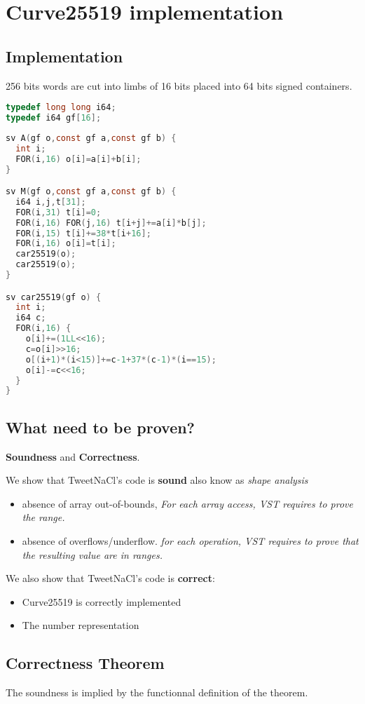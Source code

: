 \section{Curve25519 implementation}

\subsection{Implementation}

256 bits words are cut into limbs of 16 bits placed into 64 bits signed
containers.
\begin{lstlisting}[language=C]
typedef long long i64;
typedef i64 gf[16];
\end{lstlisting}

\begin{lstlisting}[language=C]
sv A(gf o,const gf a,const gf b) {
  int i;
  FOR(i,16) o[i]=a[i]+b[i];
}

sv M(gf o,const gf a,const gf b) {
  i64 i,j,t[31];
  FOR(i,31) t[i]=0;
  FOR(i,16) FOR(j,16) t[i+j]+=a[i]*b[j];
  FOR(i,15) t[i]+=38*t[i+16];
  FOR(i,16) o[i]=t[i];
  car25519(o);
  car25519(o);
}

sv car25519(gf o) {
  int i;
  i64 c;
  FOR(i,16) {
    o[i]+=(1LL<<16);
    c=o[i]>>16;
    o[(i+1)*(i<15)]+=c-1+37*(c-1)*(i==15);
    o[i]-=c<<16;
  }
}
\end{lstlisting}

\subsection{What need to be proven?}

\textbf{Soundness} and \textbf{Correctness}.

We show that TweetNaCl's code is \textbf{sound} also know as \textit{shape analysis} \ie

\begin{itemize}
\item absence of array out-of-bounds,
\textit{For each array access, VST requires to prove the range.}
\item absence of overflows/underflow.
\textit{for each operation, VST requires to prove that the resulting value are in ranges.}
\end{itemize}

We also show that TweetNaCl's code is \textbf{correct}:

\begin{itemize}
\item Curve25519 is correctly implemented
\item The number representation
\end{itemize}

\subsection{Correctness Theorem}

The soundness is implied by the functionnal definition of the theorem.
